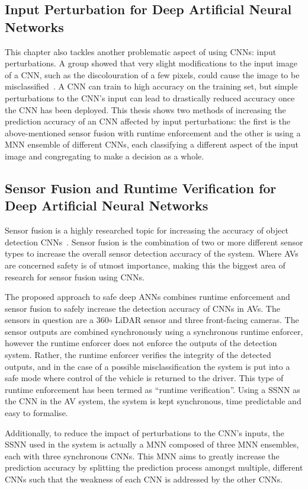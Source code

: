 \subsection{Input Perturbation for Deep Artificial Neural Networks}
This chapter also tackles another problematic aspect of using \acp{CNN}: input perturbations.
A group showed that very slight modifications to the input image of a \acf{CNN}, such as the discolouration of a few pixels, could cause the image to be misclassified~\cite{Gehr2018AI2SA}.
A \ac{CNN} can train to high accuracy on the training set, but simple perturbations to the \ac{CNN}'s input can lead to drastically reduced accuracy once the \ac{CNN} has been deployed.
This thesis shows two methods of increasing the prediction accuracy of an \ac{CNN} affected by input perturbations: the first is the above-mentioned sensor fusion with runtime enforcement and the other is using a \acf{MNN} ensemble of different \acp{CNN}, each classifying a different aspect of the input image and congregating to make a decision as a whole.


\subsection{Sensor Fusion and Runtime Verification for Deep Artificial Neural Networks}
Sensor fusion is a highly researched topic for increasing the accuracy of object detection \acp{CNN}~\cite{SensorFusion2017}. 
Sensor fusion is the combination of two or more different sensor types to increase the overall sensor detection accuracy of the system.
Where \acfp{AV} are concerned safety is of utmost importance, making this the biggest area of research for sensor fusion using \acp{CNN}.

The proposed approach to safe deep \acp{ANN} combines runtime enforcement and sensor fusion to safely increase the detection accuracy of \acp{CNN} in \acp{AV}.
The sensors in question are a 360$\circ$ \ac{LiDAR} sensor and three front-facing cameras.
The sensor outputs are combined synchronously using a synchronous runtime enforcer, however the runtime enforcer does not enforce the outputs of the detection system.
Rather, the runtime enforcer verifies the integrity of the detected outputs, and in the case of a possible misclassification the system is put into a safe mode where control of the vehicle is returned to the driver.
This type of runtime enforcement has been termed as ``runtime verification''.
Using a \acf{SSNN} as the \ac{CNN} in the \ac{AV} system, the system is kept synchronous, time predictable and easy to formalise.

Additionally, to reduce the impact of perturbations to the \ac{CNN}'s inputs, the \ac{SSNN} used in the system is actually a \ac{MNN} composed of three \ac{MNN} ensembles, each with three synchronous \acp{CNN}.
This \ac{MNN} aims to greatly increase the prediction accuracy by splitting the prediction process amongst multiple, different \acp{CNN} such that the weakness of each \ac{CNN} is addressed by the other \acp{CNN}.














